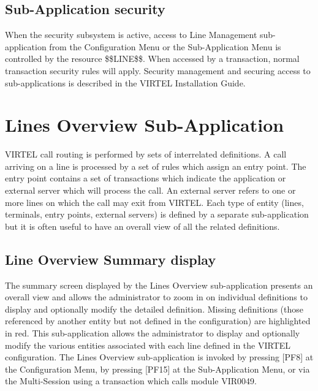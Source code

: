 \documentclass[letterpaper,10pt,english]{sphinxmanual}
\begin{document}
\subsection{Sub-Application security}
\label{\detokenize{connectivity_guide:sub-application-security}}
When the security subsystem is active, access to Line Management sub-application from the Configuration Menu or the Sub-Application Menu is controlled by the resource \$\$LINE\$\$.
When accessed by a transaction, normal transaction security rules will apply. Security management and securing access to sub-applications is described in the VIRTEL Installation Guide.


\section{Lines Overview Sub-Application}
\label{\detokenize{connectivity_guide:lines-overview-sub-application}}
VIRTEL call routing is performed by sets of interrelated definitions. A call arriving on a line is processed by a set of rules which assign an entry point. The entry point contains a set of transactions which indicate the application or external server which will process the call. An external server refers to one or more lines on which the call may exit from VIRTEL. Each type of entity (lines, terminals, entry points, external servers) is defined by a separate sub-application but it is often useful to have an overall view of all the related definitions.


\subsection{Line Overview Summary display}
\label{\detokenize{connectivity_guide:line-overview-summary-display}}
The summary screen displayed by the Lines Overview sub-application presents an overall view and allows the administrator to zoom in on individual definitions to display and optionally modify the detailed definition. Missing definitions (those referenced by another entity but not defined in the configuration) are highlighted in red. This sub-application allows the administrator to display and optionally modify the various entities associated with each line defined in the VIRTEL configuration. The Lines Overview sub-application is invoked by pressing {[}PF8{]} at the Configuration Menu, by pressing {[}PF15{]} at the Sub-Application Menu, or via the Multi-Session using a transaction which calls module VIR0049.

\end{document}
